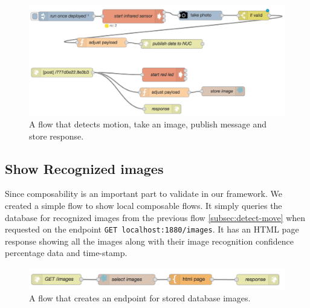 \begin{figure}[H]
	\centering
	\includegraphics[scale=0.6]{images/flow-motion.png}
	\caption{A flow that detects motion, take an image, publish message and store response.}
	\label{fig:flow-motion}
\end{figure}


\subsection{Show Recognized images}\label{subsec:images}
Since composability is an important part to validate in our framework. We created a simple flow to show local composable flows. It simply queries the database for recognized images from the previous flow \ref{subsec:detect-move} when requested on the endpoint \verb|GET localhost:1880/images|. It has an HTML page response showing all the images along with their image recognition confidence percentage data and time-stamp.

\begin{figure}[H]
	\centering
	\includegraphics[scale=0.6]{images/flow-images.png}
	\caption{A flow that creates an endpoint for stored database images.}
	\label{fig:flow-image}
\end{figure}

